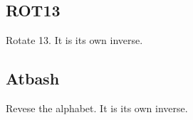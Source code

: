 
\subsection{ROT13}

Rotate 13. It is its own inverse.

\subsection{Atbash}

Revese the alphabet. It is its own inverse.


